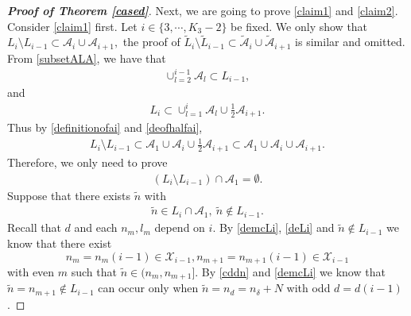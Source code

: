 \documentclass[12pt]{amsart}
\theoremstyle{plain}
\theoremstyle{definition}
\begin{document}
\begin{proof}[\textbf{Proof of Theorem \ref{cased}}]
Next, we are going to prove \eqref{claim1} and \eqref{claim2}. Consider \eqref{claim1} first. Let $i\in \{3,\cdots,K_3-2\}$ be fixed.
We only show that $L_{i}\setminus L_{i-1}\subset \mathcal{A}_{i}\cup \mathcal{A}_{i+1}, $ the proof of $ \tilde{L}_{i}\setminus \tilde{L}_{i-1}\subset \tilde{\mathcal{A}}_{i}\cup \tilde{\mathcal{A}}_{i+1}$ is similar and omitted.  From \eqref{subsetALA}, we have that
\begin{align}
\cup_{l=2}^{i-1}\mathcal{A}_l\subset L_{i-1},\nonumber
\end{align}
and 
\begin{align}
L_i\subset \cup_{l=1}^i\mathcal{A}_l\cup\frac{1}{2}\mathcal{A}_{i+1}.\nonumber
\end{align}
Thus by \eqref{definitionofai} and \eqref{deofhalfai},
\begin{align}
L_i\setminus L_{i-1}\subset \mathcal{A}_1\cup \mathcal{A}_i\cup\frac{1}{2}\mathcal{A}_{i+1}\subset \mathcal{A}_1\cup \mathcal{A}_i\cup\mathcal{A}_{i+1}.\nonumber
\end{align}
Therefore, we only need to prove 
\begin{align}
	(L_i\setminus L_{i-1})\cap \mathcal{A}_1=\emptyset.\nonumber
\end{align}
Suppose that there exists $\tilde{n}$ with
\begin{align}
	\tilde{n}\in L_i\cap\mathcal{A}_1,\ \tilde{n}\notin L_{i-1}.\nonumber
\end{align}
Recall that $d$ and each $n_m,l_m$ depend on $i$. By \eqref{demcLi}, \eqref{deLi} and $\tilde{n}\notin L_{i-1}$ we know that there exist $$n_{m}=n_m(i-1)\in\mathcal{X}_{i-1},n_{m+1}=n_{m+1}(i-1)\in {\mathcal{X}}_{i-1}$$ 
with even $m$ such that $\tilde{n}\in(n_{m},n_{m+1}]$. By \eqref{cddn} and \eqref{demcLi} we know that $\tilde{n}=n_{m+1}\notin L_{i-1}$ can occur only when $\tilde{n}=n_{d}=n_{\delta}+N$ with odd $d=d(i-1)$. 





\end{proof}
\end{document}
